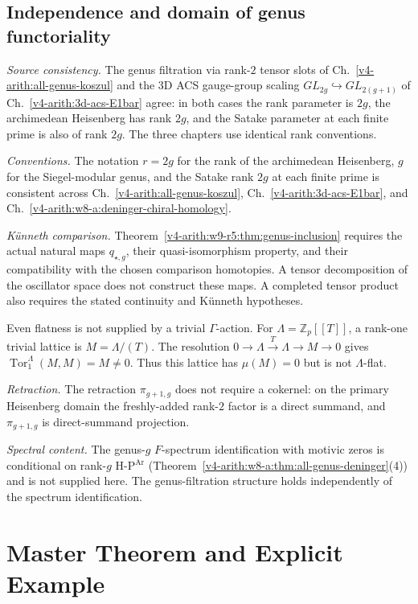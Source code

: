 \subsection*{Independence and domain of genus functoriality}
\label{v4-arith:w9-r5:ah:g}

\emph{Source consistency.} The genus filtration via rank-\(2\) tensor
slots of Ch.~\ref{v4-arith:all-genus-koszul} and the 3D ACS gauge-group
scaling \(GL_{2g}\hookrightarrow GL_{2(g+1)}\) of
Ch.~\ref{v4-arith:3d-acs-E1bar} agree: in both cases the rank parameter
is \(2g\), the archimedean Heisenberg has rank \(2g\), and the Satake
parameter at each finite prime is also of rank \(2g\). The three
chapters use identical rank conventions.

\emph{Conventions.} The notation \(r=2g\) for the rank of the
archimedean Heisenberg, \(g\) for the Siegel-modular genus, and the
Satake rank \(2g\) at each finite prime is consistent across
Ch.~\ref{v4-arith:all-genus-koszul},
Ch.~\ref{v4-arith:3d-acs-E1bar}, and
Ch.~\ref{v4-arith:w8-a:deninger-chiral-homology}.

\emph{K\"unneth comparison.} Theorem~\ref{v4-arith:w9-r5:thm:genus-inclusion}
requires the actual natural maps \(q_{\star,g}\), their
quasi-isomorphism property, and their compatibility with the chosen
comparison homotopies. A tensor decomposition of the oscillator
space does not construct these maps. A completed tensor product also
requires the stated continuity and K\"unneth hypotheses.

Even flatness is not supplied by a trivial \(\Gamma\)-action.
For \(\Lambda=\mathbb Z_p[[T]]\), a rank-one trivial lattice is
\(M=\Lambda/(T)\). The resolution
\(0\to\Lambda\xrightarrow{T}\Lambda\to M\to0\) gives
\(\operatorname{Tor}_1^\Lambda(M,M)=M\ne0\).
Thus this lattice has \(\mu(M)=0\) but is not \(\Lambda\)-flat.

\emph{Retraction.} The retraction \(\pi_{g+1,g}\) does not require a
cokernel: on the primary Heisenberg domain the freshly-added rank-\(2\)
factor is a direct summand, and \(\pi_{g+1,g}\) is direct-summand
projection.

\emph{Spectral content.} The genus-\(g\) \(F\)-spectrum identification
with motivic zeros is conditional on rank-\(g\) H-P\(^{\mathrm{Ar}}\)
(Theorem~\ref{v4-arith:w8-a:thm:all-genus-deninger}(4)) and is not supplied
here. The genus-filtration structure holds independently of the
spectrum identification.

\section{Master Theorem and Explicit Example}
\label{v4-arith:w9-r5:master}

